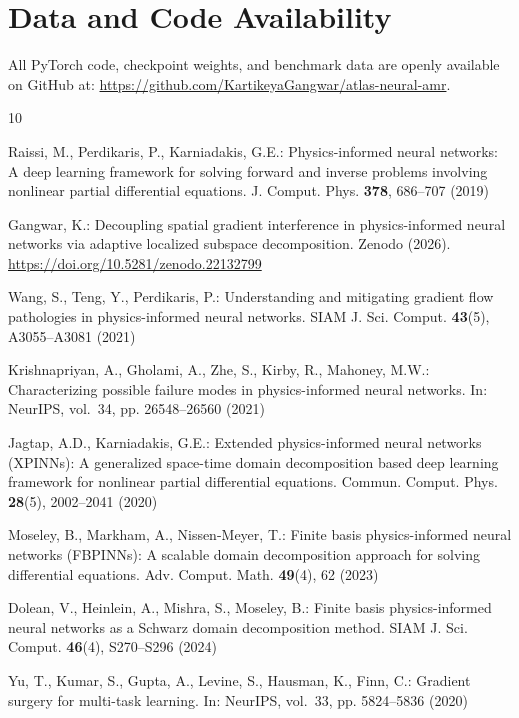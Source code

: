 \documentclass[runningheads]{llncs}
\begin{document}
\section*{Data and Code Availability}
All PyTorch code, checkpoint weights, and benchmark data are openly available on GitHub at: \url{https://github.com/KartikeyaGangwar/atlas-neural-amr}.

\begin{thebibliography}{10}

Raissi, M., Perdikaris, P., Karniadakis, G.E.: Physics-informed neural networks: A deep learning framework for solving forward and inverse problems involving nonlinear partial differential equations. J. Comput. Phys. \textbf{378}, 686--707 (2019)

Gangwar, K.: Decoupling spatial gradient interference in physics-informed neural networks via adaptive localized subspace decomposition. Zenodo (2026). \url{https://doi.org/10.5281/zenodo.22132799}

Wang, S., Teng, Y., Perdikaris, P.: Understanding and mitigating gradient flow pathologies in physics-informed neural networks. SIAM J. Sci. Comput. \textbf{43}(5), A3055--A3081 (2021)

Krishnapriyan, A., Gholami, A., Zhe, S., Kirby, R., Mahoney, M.W.: Characterizing possible failure modes in physics-informed neural networks. In: NeurIPS, vol.~34, pp. 26548--26560 (2021)

Jagtap, A.D., Karniadakis, G.E.: Extended physics-informed neural networks (XPINNs): A generalized space-time domain decomposition based deep learning framework for nonlinear partial differential equations. Commun. Comput. Phys. \textbf{28}(5), 2002--2041 (2020)

Moseley, B., Markham, A., Nissen-Meyer, T.: Finite basis physics-informed neural networks (FBPINNs): A scalable domain decomposition approach for solving differential equations. Adv. Comput. Math. \textbf{49}(4), 62 (2023)

Dolean, V., Heinlein, A., Mishra, S., Moseley, B.: Finite basis physics-informed neural networks as a Schwarz domain decomposition method. SIAM J. Sci. Comput. \textbf{46}(4), S270--S296 (2024)

Yu, T., Kumar, S., Gupta, A., Levine, S., Hausman, K., Finn, C.: Gradient surgery for multi-task learning. In: NeurIPS, vol.~33, pp. 5824--5836 (2020)


\end{thebibliography}
\end{document}
